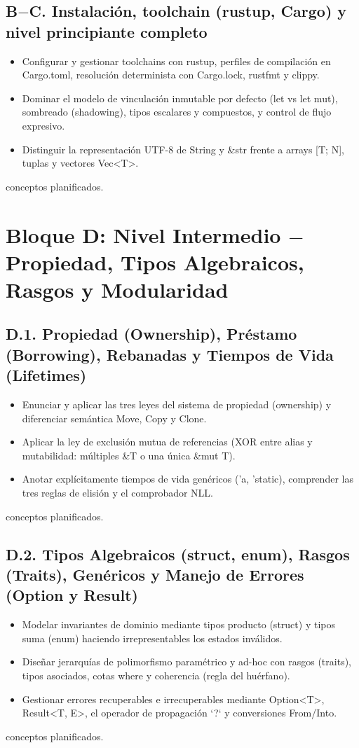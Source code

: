 \documentclass{book}
\begin{document}
\subsection*{\checkmark B\(-\)C. Instalación, toolchain (rustup, Cargo) y nivel principiante completo}
\begin{itemize}
\item Configurar y gestionar toolchains con rustup, perfiles de compilación en Cargo.toml, resolución determinista con Cargo.lock, rustfmt y clippy.
\item Dominar el modelo de vinculación inmutable por defecto (let vs let mut), sombreado (shadowing), tipos escalares y compuestos, y control de flujo expresivo.
\item Distinguir la representación UTF-8 de String y \&str frente a arrays [T; N], tuplas y vectores Vec<T>.
\end{itemize}
 conceptos planificados.

\section*{Bloque D: Nivel Intermedio \(-\) Propiedad, Tipos Algebraicos, Rasgos y Modularidad}

\subsection*{\checkmark D.1. Propiedad (Ownership), Préstamo (Borrowing), Rebanadas y Tiempos de Vida (Lifetimes)}
\begin{itemize}
\item Enunciar y aplicar las tres leyes del sistema de propiedad (ownership) y diferenciar semántica Move, Copy y Clone.
\item Aplicar la ley de exclusión mutua de referencias (XOR entre alias y mutabilidad: múltiples \&T o una única \&mut T).
\item Anotar explícitamente tiempos de vida genéricos ('a, 'static), comprender las tres reglas de elisión y el comprobador NLL.
\end{itemize}
 conceptos planificados.

\subsection*{\checkmark D.2. Tipos Algebraicos (struct, enum), Rasgos (Traits), Genéricos y Manejo de Errores (Option y Result)}
\begin{itemize}
\item Modelar invariantes de dominio mediante tipos producto (struct) y tipos suma (enum) haciendo irrepresentables los estados inválidos.
\item Diseñar jerarquías de polimorfismo paramétrico y ad-hoc con rasgos (traits), tipos asociados, cotas where y coherencia (regla del huérfano).
\item Gestionar errores recuperables e irrecuperables mediante Option<T>, Result<T, E>, el operador de propagación `?` y conversiones From/Into.
\end{itemize}
 conceptos planificados.
\end{document}
